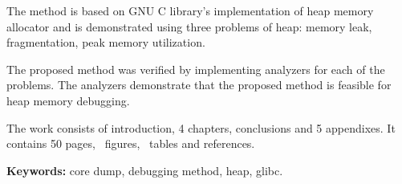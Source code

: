 The method is based on GNU C library's implementation of heap memory allocator and is demonstrated using three problems of heap: memory leak, fragmentation, peak memory utilization.

The proposed method was verified by implementing analyzers for each of the problems.
The analyzers demonstrate that the proposed method is feasible for heap memory debugging.


\thispagestyle{empty}
	The work consists of introduction, 4 chapters, conclusions and 5 appendixes. It contains 50 pages, \totfig\ figures, \tottab\ tables and  references.

\textbf{Keywords:} core dump, debugging method, heap, glibc.


\newpage 






